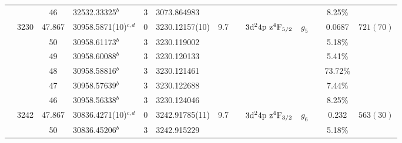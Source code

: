 \begin{table*}
\begin{center}
{\begin{tabular}{:l;l;c;l;c;l;c;l;l;c;c;c;c}
\rowstyle{\itshape}               &        & 46        & 32532.33325$^{b}$                & 3 &   3073.864983      &      & $                                        $ & $                                        $ & $      $ &              & 8.25\%    & $          $\\
                                  & 3230   & 47.867    & 30958.5871(10)$^{c,d}$           & 0 &    3230.12157(10)  &  9.7 & $                                        $ & $3\rm{d}^24\rm{p~z}^4\rm{F}_{5/2}        $ & $g_{5} $ &              & 0.0687    & $  721(70) $\\
\rowstyle{\itshape}               &        & 50        & 30958.61173$^{b}$                & 3 &   3230.119002      &      & $                                        $ & $                                        $ & $      $ &              & 5.18\%    & $          $\\
\rowstyle{\itshape}               &        & 49        & 30958.60088$^{b}$                & 3 &   3230.120133      &      & $                                        $ & $                                        $ & $      $ &              & 5.41\%    & $          $\\
\rowstyle{\itshape}               &        & 48        & 30958.58816$^{b}$                & 3 &   3230.121461      &      & $                                        $ & $                                        $ & $      $ &              & 73.72\%   & $          $\\
\rowstyle{\itshape}               &        & 47        & 30958.57639$^{b}$                & 3 &   3230.122688      &      & $                                        $ & $                                        $ & $      $ &              & 7.44\%    & $          $\\
\rowstyle{\itshape}               &        & 46        & 30958.56338$^{b}$                & 3 &   3230.124046      &      & $                                        $ & $                                        $ & $      $ &              & 8.25\%    & $          $\\
                                  & 3242   & 47.867    & 30836.4271(10)$^{c,d}$           & 0 &    3242.91785(11)  &  9.7 & $                                        $ & $3\rm{d}^24\rm{p~z}^4\rm{F}_{3/2}        $ & $g_{6} $ &              & 0.232     & $  563(30) $\\
\rowstyle{\itshape}               &        & 50        & 30836.45206$^{b}$                & 3 &   3242.915229      &      & $                                        $ & $                                        $ & $      $ &              & 5.18\%    & $          $\\

\end{tabular}}
\end{center}
\end{table*}
